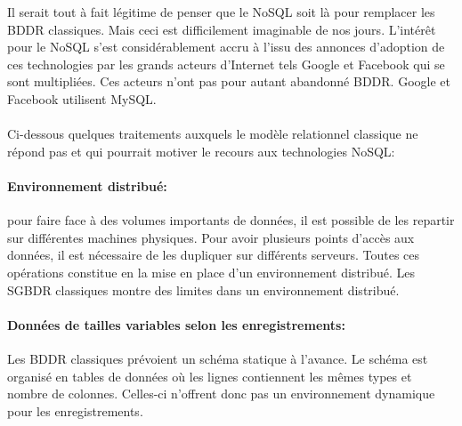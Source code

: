 Il serait tout à fait légitime de penser que le 
\textsf{NoSQL} soit là pour remplacer les \textsf{BDDR}
classiques. Mais ceci est difficilement imaginable de
nos jours. L’intérêt pour le \textsf{NoSQL} s'est considérablement
accru à l'issu des annonces d’adoption de ces technologies par les 
grands acteurs d'\textsf{Internet} tels 
\textsf{Google} et \textsf{Facebook} qui se sont multipliées. Ces acteurs
n'ont pas pour autant abandonné \textsf{BDDR}. \textsf{Google} et 
\textsf{Facebook} utilisent \textsf{MySQL}\cite{mysqlcustomers}.
\\
\\
Ci-dessous quelques traitements auxquels le modèle relationnel
classique ne répond pas et qui pourrait motiver le recours aux
technologies \textsf{NoSQL}:


\paragraph{Environnement distribué:} pour faire face à des volumes importants 
de données, il est possible de les repartir sur différentes machines physiques. 
Pour avoir plusieurs points d'accès aux données, il est nécessaire de les dupliquer
sur différents serveurs. Toutes ces opérations constitue en la mise en place d'un 
environnement distribué. Les \textsf{SGBDR} classiques montre des limites dans un 
environnement distribué.\cite{} 

\paragraph{Données de tailles variables selon les enregistrements:} Les 
\textsf{BDDR} classiques prévoient un schéma statique à 
l'avance. Le schéma est organisé en tables de données où les lignes 
contiennent les mêmes types et nombre de colonnes. Celles-ci n'offrent donc 
pas un environnement dynamique pour les enregistrements.

